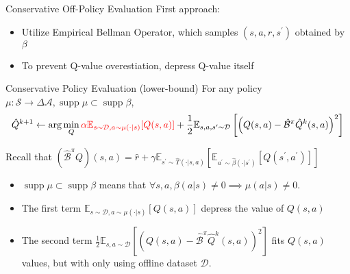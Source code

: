 \documentclass[11pt]{beamer}
\newcommand{\mbb}[1]{\mathbb{#1}}
\newcommand{\mc}[1]{\mathcal{#1}}
\newcommand{\supp}{\operatorname{supp}}
\begin{document}
\begin{frame}{Conservative Off-Policy Evaluation}
  First approach:
  \begin{itemize}
    \item Utilize Empirical Bellman Operator, which samples $(s,a,r,s^\prime)$ obtained by $\beta$
    \item To prevent Q-value overestiation, depress Q-value itself
  \end{itemize}

  \begin{block}{Conservative Policy Evaluation (lower-bound)}
    For any policy $\mu : \mc{S} \to \Delta{\mc{A}}, \supp \mu \subset \supp \beta$,
    \[
      \hat{Q}^{k+1} \leftarrow \arg \min_{Q} \textcolor{red}{\alpha \mbb{E}_{s \sim \mc{D}, a \sim \mu(\cdot|s)}[Q(s,a)]} + \frac{1}{2} \mbb{E}_{s,a, s^\prime \sim \mc{D}} \left[\left(Q(s,a) - \hat{\mc{B}}^\pi \hat{Q}^k (s,a)\right)^2\right]
    \]

    Recall that $ (\hat{\mc{B}}^\pi Q)(s,a) = \hat{r} + \gamma \mbb{E}_{s^\prime \sim \hat{T}(\cdot | s,a)}\left[\mbb{E}_{a^\prime \sim \hat{\beta}(\cdot |s^\prime)} \left[ Q(s^\prime,a^\prime) \right]\right]$
  \end{block}

  \begin{itemize}
    \item $\supp \mu \subset \supp \beta$ means that $\forall s,a, \beta(a|s) \neq 0 \implies \mu(a|s)\neq 0$.
    \item The first term $\mbb{E}_{s \sim \mc{D}, a \sim \mu(\cdot|s)}[Q(s,a)]$ depress the value of $Q(s,a)$
    \item The second term $\frac{1}{2} \mbb{E}_{s,a \sim \mc{D}} \left[\left(Q(s,a) - \hat{\mc{B}}^\pi \hat{Q}^k (s,a)\right)^2\right]$ fits $Q(s,a)$ values, but with only using offline dataset $\mc{D}$.

  \end{itemize}
\end{frame}
\end{document}
